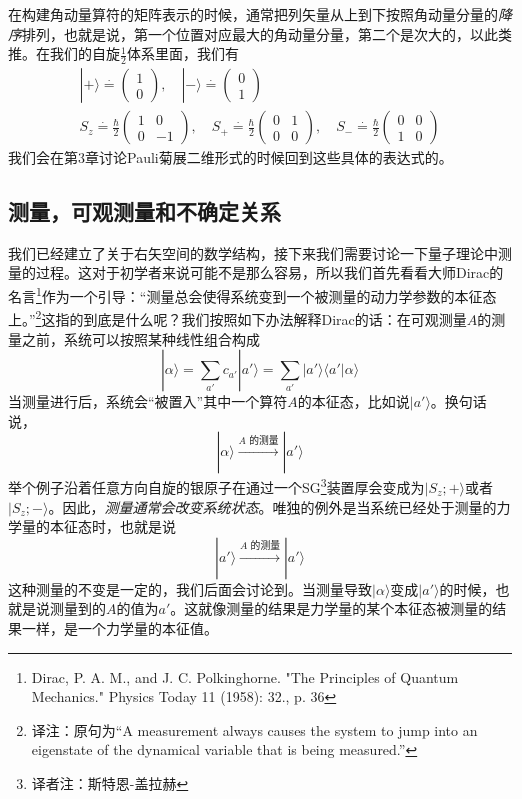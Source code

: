 \documentclass[UTF8,twoside]{ctexart}
\def\be{\begin{equation}}
\def\ee{\end{equation}}
\begin{document}
在构建角动量算符的矩阵表示的时候，通常把列矢量从上到下按照角动量分量的{\it 降序}排列，也就是说，第一个位置对应最大的角动量分量，第二个是次大的，以此类推。在我们的自旋$\frac{1}{2}$体系里面，我们有
\begin{subequations}
\begin{align}
|+\rangle\overset{\cdot}{=}\left(\begin{matrix}1\\0\end{matrix}\right),\quad |-\rangle \overset{\cdot}{=}\left(\begin{matrix}0\\1\end{matrix}\right)\\
S_z\overset{\cdot}{=}\frac{\hbar}{2}\left(\begin{matrix}1&0\\0&-1\end{matrix}\right),\quad S_+\overset{\cdot}{=}\frac{\hbar}{2}\left(\begin{matrix}0&1\\0&0\end{matrix}\right),\quad S_-\overset{\cdot}{=}\frac{\hbar}{2}\left(\begin{matrix}0&0\\1&0\end{matrix}\right)
\end{align}
\end{subequations}
我们会在第3章讨论Pauli菊展二维形式的时候回到这些具体的表达式的。%

\subsection{测量，可观测量和不确定关系}


我们已经建立了关于右矢空间的数学结构，接下来我们需要讨论一下量子理论中测量的过程。这对于初学者来说可能不是那么容易，所以我们首先看看大师Dirac的名言\footnote{Dirac, P. A. M., and J. C. Polkinghorne. "The Principles of Quantum Mechanics." Physics Today 11 (1958): 32., p. 36}作为一个引导：``测量总会使得系统变到一个被测量的动力学参数的本征态上。''\footnote{译注：原句为``A measurement always causes the system to jump into an eigenstate of the dynamical variable that is being measured.''}这指的到底是什么呢？我们按照如下办法解释Dirac的话：在可观测量$A$的测量之前，系统可以按照某种线性组合构成
\be\label{1.4.1}
|\alpha\rangle = \sum_{a'}c_{a'}|a'\rangle = \sum_{a'}|a'\rangle\langle a'|\alpha\rangle
\ee
当测量进行后，系统会``被置入''其中一个算符$A$的本征态，比如说$|a'\rangle $。换句话说，
\be
|\alpha\rangle\xrightarrow[]{A\text{ 的测量}}|a'\rangle
\ee
举个例子沿着任意方向自旋的银原子在通过一个SG\footnote{译者注：斯特恩-盖拉赫}装置厚会变成为$|S_z;+\rangle$或者$|S_z;-\rangle$。因此，{\it 测量通常会改变系统状态}。唯独的例外是当系统已经处于测量的力学量的本征态时，也就是说
\be
|a'\rangle\xrightarrow[]{A\text{ 的测量}}|a'\rangle
\ee
这种测量的不变是一定的，我们后面会讨论到。当测量导致$|\alpha\rangle$变成$|a'\rangle$的时候，也就是说测量到的$A$的值为$a'$。这就像测量的结果是力学量的某个本征态被测量的结果一样，是一个力学量的本征值。
\end{document}
